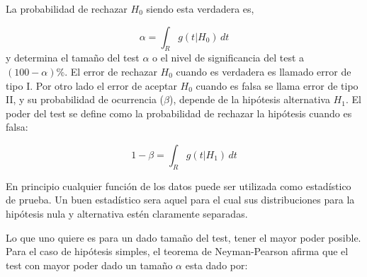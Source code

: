 


La probabilidad de rechazar $H_0$ siendo esta verdadera es,

\begin{equation}
  \alpha =  \int_{R} g(t|H_0)\, dt
\end{equation}
%
y determina el tama\~no del test $\alpha$ o el nivel de significancia del test a
$(100 - \alpha) \%$. El error de rechazar $H_0$ cuando es verdadera es llamado error de tipo I.
Por otro lado el error de aceptar $H_0$ cuando es falsa se llama error de tipo II, y su
probabilidad de ocurrencia ($\beta$), depende de la hipótesis alternativa $H_1$.
El poder del test se define como la probabilidad de rechazar la hipótesis cuando
es falsa:

\begin{equation}
1-\beta = \int_R g(t|H_1)\, dt
\end{equation}

En principio cualquier función de los datos puede ser utilizada como estadístico de prueba. Un buen
estadístico sera aquel para el cual sus distribuciones para la hipótesis nula y alternativa estén
claramente separadas.

Lo que uno quiere es para un dado tama\~no del test, tener el mayor poder posible.
Para el caso de hipótesis simples, el teorema de Neyman-Pearson afirma que el test
con mayor poder dado un tama\~no $\alpha$ esta dado por:




